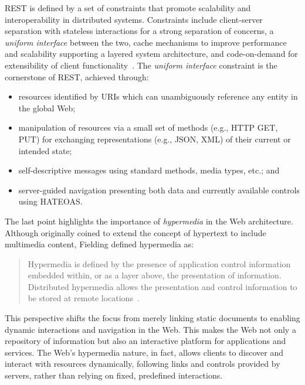 \ac{REST} is defined by a set of constraints that promote scalability and interoperability in distributed systems. 
%
Constraints include client-server separation with stateless interactions for a strong separation of concerns, a \emph{uniform interface} between the two, cache mechanisms to improve performance and scalability supporting a layered system architecture, and code-on-demand for extensibility of client functionality~\cite{fielding2000architectural}.
%
The \emph{uniform interface} constraint is the cornerstone of \ac{REST}, achieved through:
\begin{itemize}
    \item resources identified by \acp{URI} which can unambiguously reference any entity in the global Web;
    \item manipulation of resources via a small set of methods (e.g., HTTP GET, PUT) for exchanging representations (e.g., JSON, XML) of their current or intended state; 
    \item self-descriptive messages using standard methods, media types, etc.;
    and
    \item server-guided navigation presenting both data and currently available controls using \ac{HATEOAS}.
\end{itemize}

The last point highlights the importance of \emph{hypermedia} in the Web architecture.
%
Although originally coined to extend the concept of hypertext to include multimedia content, Fielding defined hypermedia as:

\begin{quote}
Hypermedia is defined by the presence of application control information embedded within, or as a layer above, the presentation of information. Distributed hypermedia allows the presentation and control information to be stored at remote locations~\cite{fielding2000architectural}.
\end{quote}

This perspective shifts the focus from merely linking static documents to enabling dynamic interactions and navigation in the Web.
%
This makes the Web not only a repository of information but also an interactive platform for applications and services.
%
The Web's hypermedia nature, in fact, allows clients to discover and interact with resources dynamically, following links and controls provided by servers, rather than relying on fixed, predefined interactions.

